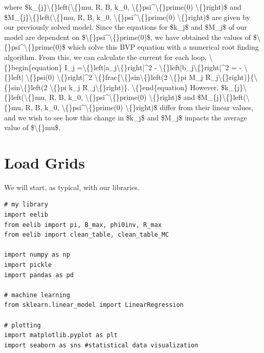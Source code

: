 \documentclass{article}
\begin{document}
where \$k\_\{j\}\textbackslash\{\}left(\textbackslash\{\}mu, R, B, k\_0, \textbackslash\{\}psi\textasciicircum{}\textbackslash\{\}prime(0) \textbackslash\{\}right)\$ and \$M\_\{j\}\textbackslash\{\}left(\textbackslash\{\}mu, R, B, k\_0, \textbackslash\{\}psi\textasciicircum{}\textbackslash\{\}prime(0) \textbackslash\{\}right)\$ are given by our previously solved model. Since the equations for \$k\_j\$ and \$M\_j\$ of our model are dependent on \$\textbackslash\{\}psi\textasciicircum{}\textbackslash\{\}prime(0)\$, we have obtained the values of \$\textbackslash\{\}psi\textasciicircum{}\textbackslash\{\}prime(0)\$ which solve this BVP equation with a numerical root finding algorithm. From this, we can calculate the current for each loop,
\textbackslash\{\}begin\{equation\}
I\_j =\textbackslash\{\}left|a\_j\textbackslash\{\}right|\textasciicircum{}2 - \textbackslash\{\}left|b\_j\textbackslash\{\}right|\textasciicircum{}2 = - \textbackslash\{\}left| \textbackslash\{\}psi(0) \textbackslash\{\}right|\textasciicircum{}2 \textbackslash\{\}frac\{\textbackslash\{\}sin\textbackslash\{\}left(2 \textbackslash\{\}pi M\_j R\_j\textbackslash\{\}right)\}\{\textbackslash\{\}sin\textbackslash\{\}left(2 \textbackslash\{\}pi k\_j R\_j\textbackslash\{\}right)\}.
\textbackslash\{\}end\{equation\}
However, \$k\_\{j\}\textbackslash\{\}left(\textbackslash\{\}mu, R, B, k\_0, \textbackslash\{\}psi\textasciicircum{}\textbackslash\{\}prime(0) \textbackslash\{\}right)\$ and \$M\_\{j\}\textbackslash\{\}left(\textbackslash\{\}mu, R, B, k\_0, \textbackslash\{\}psi\textasciicircum{}\textbackslash\{\}prime(0) \textbackslash\{\}right)\$ differ from their linear values, and we wish to see how this change in \$k\_j\$ and \$M\_j\$ impacts the average value of \$\textbackslash\{\}mu\$.


\section{Load Grids}

We will start, as typical, with our libraries.

\begin{lstlisting}
# my library
import eelib
from eelib import pi, B_max, phi0inv, R_max
from eelib import clean_table, clean_table_MC

import numpy as np
import pickle
import pandas as pd

# machine learning
from sklearn.linear_model import LinearRegression

# plotting
import matplotlib.pyplot as plt
import seaborn as sns #statistical data visualization
\end{lstlisting}
\end{document}
